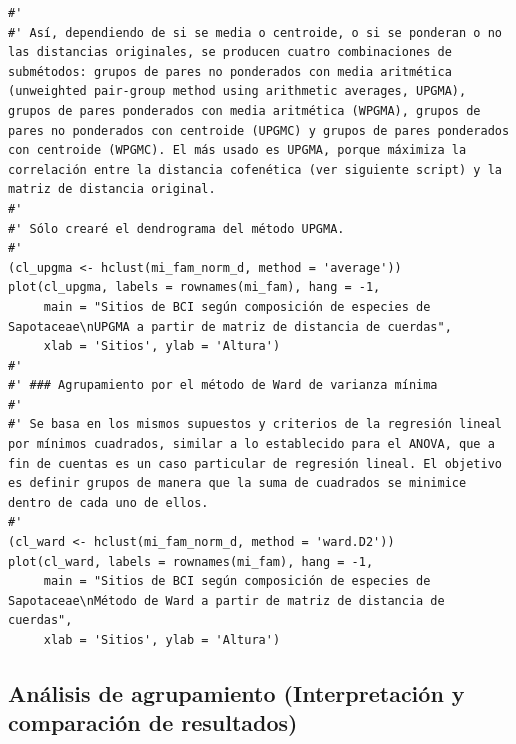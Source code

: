 \documentclass[11pt,]{article}
\begin{document}
\begin{verbatim}
#' 
#' Así, dependiendo de si se media o centroide, o si se ponderan o no las distancias originales, se producen cuatro combinaciones de submétodos: grupos de pares no ponderados con media aritmética (unweighted pair-group method using arithmetic averages, UPGMA), grupos de pares ponderados con media aritmética (WPGMA), grupos de pares no ponderados con centroide (UPGMC) y grupos de pares ponderados con centroide (WPGMC). El más usado es UPGMA, porque máximiza la correlación entre la distancia cofenética (ver siguiente script) y la matriz de distancia original.
#' 
#' Sólo crearé el dendrograma del método UPGMA.
#' 
(cl_upgma <- hclust(mi_fam_norm_d, method = 'average'))
plot(cl_upgma, labels = rownames(mi_fam), hang = -1,
     main = "Sitios de BCI según composición de especies de Sapotaceae\nUPGMA a partir de matriz de distancia de cuerdas",
     xlab = 'Sitios', ylab = 'Altura')
#' 
#' ### Agrupamiento por el método de Ward de varianza mínima
#' 
#' Se basa en los mismos supuestos y criterios de la regresión lineal por mínimos cuadrados, similar a lo establecido para el ANOVA, que a fin de cuentas es un caso particular de regresión lineal. El objetivo es definir grupos de manera que la suma de cuadrados se minimice dentro de cada uno de ellos.
#' 
(cl_ward <- hclust(mi_fam_norm_d, method = 'ward.D2'))
plot(cl_ward, labels = rownames(mi_fam), hang = -1,
     main = "Sitios de BCI según composición de especies de Sapotaceae\nMétodo de Ward a partir de matriz de distancia de cuerdas",
     xlab = 'Sitios', ylab = 'Altura')
\end{verbatim}

\subsection{Análisis de agrupamiento (Interpretación y comparación de
resultados)}\label{anuxe1lisis-de-agrupamiento-interpretaciuxf3n-y-comparaciuxf3n-de-resultados}
\end{document}
